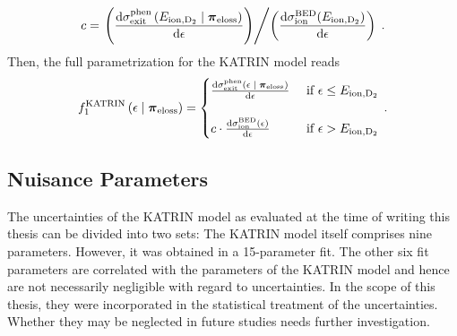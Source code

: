 \begin{equation}
c = \left.	
	\left(
		\katrinElossPhen{\ionEnergyDeu}
	\right)
\middle/
	\left(
		\katrinElossBDE{\ionEnergyDeu}
	\right)
\right.
\fullstop
\end{equation}
Then, the full parametrization for the KATRIN model reads~\cite{Hannen2019_1}
\begin{equation}
	f_1^\mathrm{KATRIN}
	\giventhat*{\epsilon}{\nuisanceParamVec_\mathrm{eloss}} = 
	\begin{cases}
	\katrinElossPhen{\epsilon}
	&\text{ if } \epsilon \leq E_\mathrm{ion,D_2} \\
	\vphantom{.} & \\
	c \cdot \katrinElossBDE{\epsilon} 
	&\text{ if } \epsilon > E_\mathrm{ion,D_2}
	\end{cases}
	\fullstop
\end{equation}

\subsection{Nuisance Parameters}
The uncertainties of the KATRIN model as evaluated at the time of writing this thesis can be divided into two sets: The KATRIN model itself comprises nine parameters. However, it was obtained in a 15-parameter fit. The other six fit parameters are correlated with the parameters of the KATRIN model and hence are not necessarily negligible with regard to uncertainties. In the scope of this thesis, they were incorporated in the statistical treatment of the uncertainties. Whether they may be neglected in future studies needs further investigation. 

